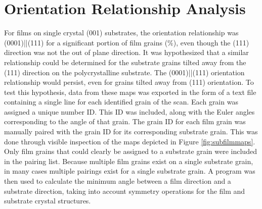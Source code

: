 \section{Orientation Relationship Analysis}
\label{sec:poly.growth.orients}


For  films on single crystal  (001) substrates, the orientation
relationship was (0001)||\-(111) for a significant portion of film
grains (\%), even though the  (111) direction was not the out of
plane direction. It was hypothesized that a similar relationship could be determined for
the substrate grains tilted away from the (111) direction on the polycrystalline
substrate. The (0001)||(111) orientation relationship would persist,
even for grains tilted away from (111) orientation. To test this hypothesis, data from
these maps was exported in the form of a text file containing a single line for each
identified grain of the scan. Each grain was assigned a unique number ID. This ID was
included, along with the Euler angles corresponding to the angle of that grain.  The grain
ID for each film grain was manually paired with the grain ID for its corresponding
substrate grain. This was done through visible inspection of the maps depicted in Figure
\ref{fig:subfilmmaps}. Only film grains that could clearly be assigned to a substrate
grain were included in the pairing list. Because multiple film grains exist on a single
substrate grain, in many cases multiple pairings exist for a single substrate grain. A
program was then used to calculate the minimum angle between a film direction and a
substrate direction, taking into account symmetry operations for the film and substrate
crystal structures. 

